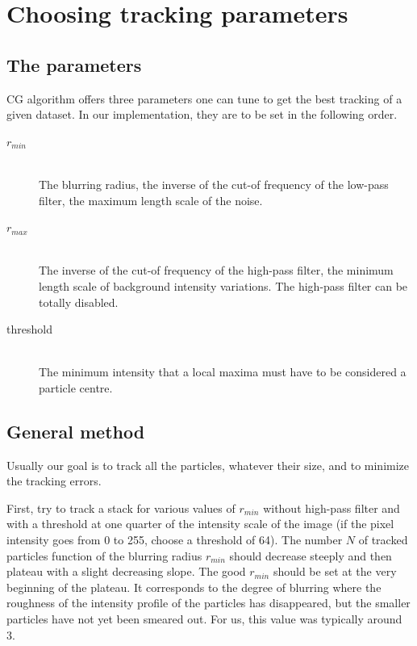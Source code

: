 \section{Choosing tracking parameters}

\subsection{The parameters}

\ac{CG} algorithm offers three parameters one can tune to get the best tracking of a given dataset. In our implementation, they are to be set in the following order.
\begin{description}
	\item[$r_{min}$] \hfill \\
		The blurring radius,  the inverse of the cut-of frequency of the low-pass filter,  the maximum length scale of the noise.
	\item[$r_{max}$] \hfill \\
		The inverse of the cut-of frequency of the high-pass filter,  the minimum length scale of background intensity variations. The high-pass filter can be totally disabled.
	\item[threshold] \hfill \\
		The minimum intensity that a local maxima must have to be considered a particle centre.
\end{description}

\subsection{General method}

Usually our goal is to track all the particles, whatever their size, and to minimize the tracking errors.

First, try to track a stack for various values of $r_{min}$ without high-pass filter and with a threshold at one quarter of the intensity scale of the image (if the pixel intensity goes from 0 to 255, choose a threshold of 64). The number $N$ of tracked particles function of the blurring radius $r_{min}$ should decrease steeply and then plateau with a slight decreasing slope. The good $r_{min}$ should be set at the very beginning of the plateau. It corresponds to the degree of blurring where the roughness of the intensity profile of the particles has disappeared, but the smaller particles have not yet been smeared out. For us, this value was typically around 3.

